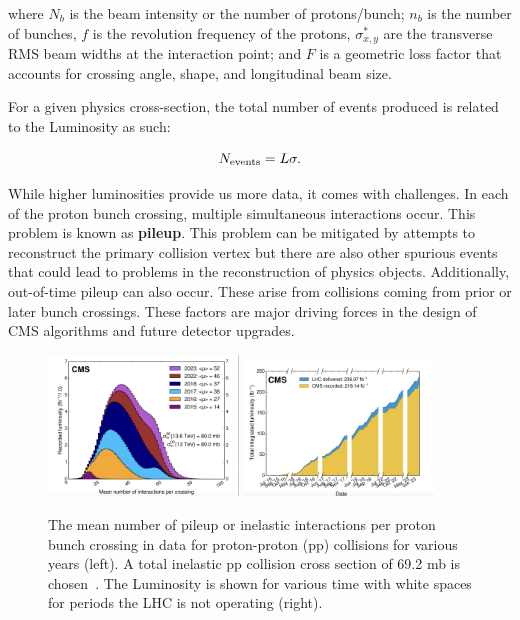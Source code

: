 where $N_{b}$ is the beam intensity or the number of protons/bunch; $n_{b}$ is the number of bunches, $f$ is the revolution frequency of the protons, $\sigma^{*}_{x,y}$ are the transverse RMS beam widths at the interaction point; and $F$ is a geometric loss factor that accounts for crossing angle, shape, and longitudinal beam size.


For a given physics cross-section, the total number of events produced is related to the Luminosity as such:

\begin{equation}
    N_{\textnormal{events} } = L \sigma.
\end{equation}

While higher luminosities provide us more data, it comes with challenges. In each of the proton bunch crossing, multiple simultaneous interactions occur. This problem is known as \textbf{pileup}. This problem can be mitigated by attempts to reconstruct the primary collision vertex but there are also other spurious events that could lead to problems in the reconstruction of physics objects. Additionally, out-of-time pileup can also occur. These arise from collisions coming from prior or later bunch crossings. These factors are major driving forces in the design of CMS algorithms and future detector upgrades. 

\begin{figure}[htbp!]
\caption{The mean number of pileup or inelastic interactions per proton bunch crossing in data
for proton-proton (pp) collisions for various years (left). A total inelastic pp collision
cross section of 69.2 mb is chosen~\cite{CMS:2020ebo}. The Luminosity is shown for various time with white spaces for periods the LHC is not operating (right).}
\begin{center}
\includegraphics[angle=0,width=0.45\textwidth]{fig/PileupAcrossTheYears.png}
\includegraphics[angle=0,width=0.45\textwidth]{fig/LuminosityAcrossTheYears.png}
\end{center}
\label{fig:LHCBeam}
\end{figure}

